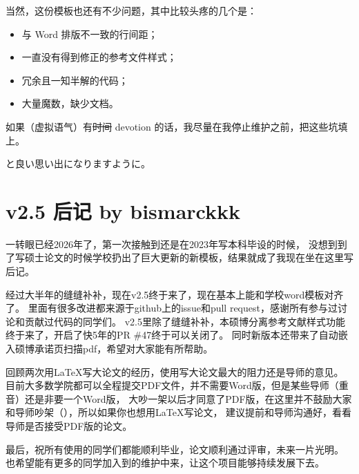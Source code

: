 当然，这份模板也还有不少问题，其中比较头疼的几个是：
\begin{itemize}
\item 与 Word 排版不一致的行间距；
\item 一直没有得到修正的参考文件样式；
\item 冗余且一知半解的代码；
\item 大量魔数，缺少文档。
\end{itemize}

如果（虚拟语气）有\sout{时间} devotion 的话，我尽量在我停止维护之前，把这些坑填上。

\nuaathesis{} と良い思い出になりますように。

\section{v2.5 后记 by bismarckkk}
一转眼已经2026年了，第一次接触到\nuaathesis 还是在2023年写本科毕设的时候，
没想到到了写硕士论文的时候学校扔出了巨大更新的新模板，结果就成了我现在坐在这里写后记。

经过大半年的缝缝补补，现在\nuaathesis v2.5终于来了，现在基本上能和学校word模板对齐了。
里面有很多改进都来源于github上的issue和pull request，感谢所有参与过讨论和贡献过代码的同学们。
v2.5里除了缝缝补补，本硕博分离参考文献样式功能终于来了，开启了快5年的PR \#47终于可以关闭了。
同时新版本还带来了自动嵌入硕博承诺页扫描pdf，希望对大家能有所帮助。

回顾两次用\LaTeX 写大论文的经历，使用\LaTex 写大论文最大的阻力还是导师的意见。
目前大多数学院都可以全程提交PDF文件，并不需要Word版，但是某些导师（重音）还是非要一个Word版，
大吵一架以后才同意了PDF版，在这里并不鼓励大家和导师吵架（），所以如果你也想用\LaTeX 写论文，
建议提前和导师沟通好，看看导师是否接受PDF版的论文。

最后，祝所有使用\nuaathesis 的同学们都能顺利毕业，论文顺利通过评审，未来一片光明。
也希望能有更多的同学加入到\nuaathesis 的维护中来，让这个项目能够持续发展下去。
